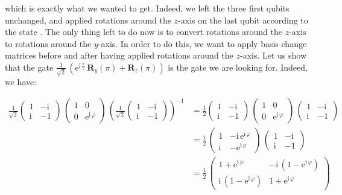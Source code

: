 \documentclass[11pt, a4paper]{article}
\begin{document}
                which is exactly what we wanted to get. Indeed, we left the three first qubits unchanged, and applied rotations around the \(z\)-axis on the last qubit according to the state . The only thing left to do now is to convert rotations around the \(z\)-axis to rotations around the \(y\)-axis. In order to do this, we want to apply basis change matrices before and after having applied rotations around the \(z\)-axis. Let us show that the gate \(\frac{1}{\sqrt{2}}\,\left(\mathrm{e}^{\mathrm{i}\,\frac\pi2}\,\mathbf{R}_y(\pi)+\mathbf{R}_z(\pi)\right)\) is the gate we are looking for. Indeed, we have:
                
                \begin{align*}
                    \frac{1}{\sqrt{2}}\begin{pmatrix}1&-\mathrm{i}\\\mathrm{i} & -1\end{pmatrix}\,\begin{pmatrix}1&0\\0&\mathrm{e}^{\mathrm{i}\,\varphi}\end{pmatrix}\,\left(\frac{1}{\sqrt{2}}\begin{pmatrix}1&-\mathrm{i}\\\mathrm{i} & -1\end{pmatrix}\right)^{-1} &= \frac12\begin{pmatrix}1&-\mathrm{i}\\\mathrm{i} & -1\end{pmatrix}\,\begin{pmatrix}1&0\\0&\mathrm{e}^{\mathrm{i}\,\varphi}\end{pmatrix}\,\begin{pmatrix}1&-\mathrm{i}\\\mathrm{i} & -1\end{pmatrix}\\
                    &= \frac12\,\begin{pmatrix}1&-\mathrm{i}\,\mathrm{e}^{\mathrm{i}\,\varphi}\\\mathrm{i} & -\mathrm{e}^{\mathrm{i}\,\varphi}\end{pmatrix}\,\begin{pmatrix}1&-\mathrm{i}\\\mathrm{i} & -1\end{pmatrix}\\
                    &= \frac12\,\begin{pmatrix}1+\mathrm{e}^{\mathrm{i}\,\varphi} & -\mathrm{i}\,\left(1-\mathrm{e}^{\mathrm{i}\,\varphi}\right)\\\mathrm{i}\,\left(1-\mathrm{e}^{\mathrm{i}\,\varphi}\right) & 1 + \mathrm{e}^{\mathrm{i}\,\varphi}\end{pmatrix}\\

\end{align*}
\end{document}
